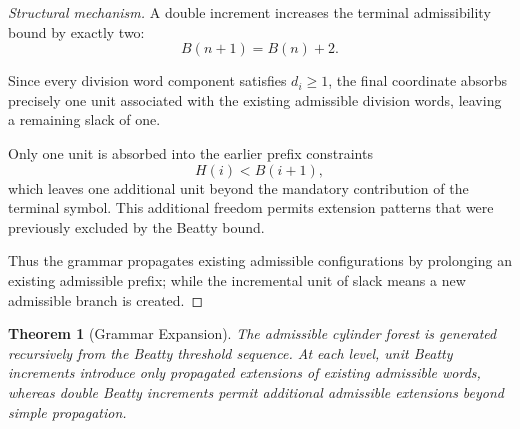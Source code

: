 \documentclass[12pt, oneside]{article}
\numberwithin{equation}{section}
\theoremstyle{definition}
\theoremstyle{plain}
\newtheorem{theorem}{Theorem}[section]
\newtheorem{lemma}[theorem]{Lemma}
\theoremstyle{remark}
\begin{document}
\begin{proof}[Structural mechanism]
A double increment increases the terminal admissibility bound by exactly
two:
\[
B(n+1)=B(n)+2.
\]

Since every division word component satisfies \(d_i\ge1\), the final
coordinate absorbs precisely one unit associated with the existing 
admissible division words, leaving a remaining slack of one.

Only one unit is absorbed into the earlier prefix constraints
\[
H(i)<B(i+1),
\]
which leaves one additional unit beyond the mandatory contribution of
the terminal symbol. This additional freedom permits extension patterns
that were previously excluded by the Beatty bound.

Thus the grammar propagates existing admissible configurations by
prolonging an existing admissible prefix; while the incremental unit of
slack means a new admissible branch is created.
\end{proof}

\begin{theorem}[Grammar Expansion]
The admissible cylinder forest is generated recursively from the Beatty
threshold sequence. At each level, unit Beatty increments introduce only
propagated extensions of existing admissible words, whereas double Beatty
increments permit additional admissible extensions beyond simple propagation.
\end{theorem}





\end{document}
